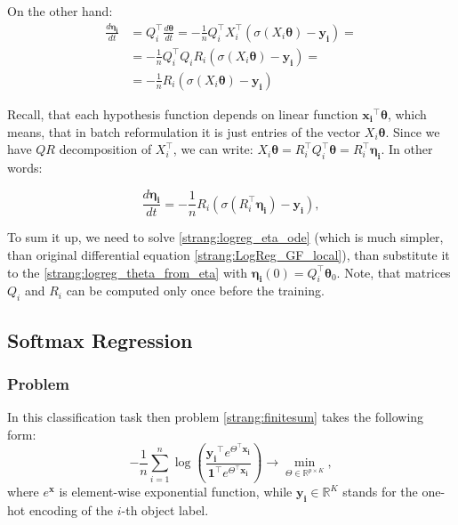 \documentclass{article}
\newcommand{\vect}[1]{\boldsymbol{\mathbf{#1}}}
\begin{document}
On the other hand:
\begin{align}\nonumber
\frac{d \vect{\eta_i}}{d t} &= Q_i^\top\frac{d \vect{\theta}}{d t} =  - \frac{1}{n} Q_i^\top  X_i^\top(\sigma\left(X_i\vect{\theta}\right) - \vect{y_i}) = \\ 
\nonumber&= - \frac{1}{n} Q_i^\top  Q_i R_i(\sigma\left(X_i\vect{\theta}\right) - \vect{y_i}) =\\
\nonumber&= - \frac{1}{n} R_i(\sigma\left(X_i\vect{\theta}\right) - \vect{y_i})
\end{align}

Recall, that each hypothesis function depends on linear function $\vect{x_i}^\top \vect{\theta}$, which means, that in batch reformulation it is just entries of the vector $X_i \vect{\theta}$. Since we have $QR$ decomposition of $X_i^\top$, we can write: $X_i \vect{\theta} = R_i^\top Q_i^\top \vect{\theta} = R_i^\top \vect{\eta_i}$. In other words:

\begin{equation}
\label{strang:logreg_eta_ode}
\frac{d \vect{\eta_i}}{d t} = - \frac{1}{n} R_i\left(\sigma\left(R_i^\top \vect{\eta_i}\right) - \vect{y_i}\right),
\end{equation}

To sum it up, we need to solve \eqref{strang:logreg_eta_ode} (which is much simpler, than original differential equation \eqref{strang:LogReg_GF_local}), than substitute it to the
\eqref{strang:logreg_theta_from_eta} with $\vect{\eta_i}(0) = Q_i^\top \vect{\theta}_0$. Note, that matrices $Q_i$ and $R_i$ can be computed only once before the training.

\subsection{Softmax Regression}
\subsubsection{Problem}
In this classification task then problem \eqref{strang:finitesum} takes the following form:
\begin{equation}\label{strang:Softmax}
-\frac{1}{n} \sum_{i=1}^n\log\left(\frac{\vect{y_i}^\top e^{\Theta^\top \vect{x_i}}}{\vect{1}^\top e^{\Theta^\top \vect{x_i}}}\right) \to \min_{\Theta \in \mathbb{R}^{p \times K}},
\end{equation}
where $e^{\vect{x}}$ is element-wise exponential function, while $ \vect{y_i} \in \mathbb{R}^K$ stands for the one-hot encoding of the $i$-th object label.
\end{document}
